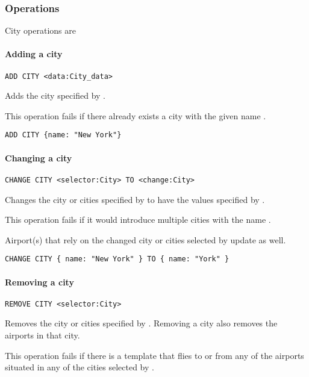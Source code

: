 \subsubsection{Operations}
City operations are
\paragraph{Adding a city}
\begin{operation}
  \lstinline{ADD CITY <data:City_data>}
  \label{op:add_city}
\end{operation}
Adds the city specified by .

This operation fails if there already exists a city with the given
name .

\begin{texa}
  \lstinline|ADD CITY {name: "New York"}|
\end{texa}

\paragraph{Changing a city}
\begin{operation}
    \lstinline|CHANGE CITY <selector:City> TO <change:City>|
    \label{op:change_city}
\end{operation}
Changes the city or cities specified by  to have the values
specified by .

This operation fails if it would introduce multiple cities with the name
.

Airport(s) that rely on the changed city or cities selected by 
update as well.

\begin{texa}
  \lstinline|CHANGE CITY { name: "New York" } TO { name: "York" }|
\end{texa}

\paragraph{Removing a city}
\begin{operation}
  \lstinline{REMOVE CITY <selector:City>}
  \label{op:remove_city}
\end{operation}
Removes the city or cities specified by . Removing a city also
removes the airports in that city.

This operation fails if there is a template that flies to or from any of the
airports situated in any of the cities selected by .

